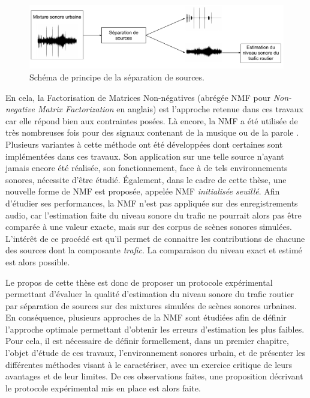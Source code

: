 \begin{figure}[h]
\centering
\includegraphics[width=\linewidth]{./figures/autres/schema_source_separation_FR.pdf}
\caption{Schéma de principe de la séparation de sources.}
\label{fig:separation_source_intro}
\end{figure}


En cela, la Factorisation de Matrices Non-négatives (abrégée NMF pour \textit{Non-negative Matrix Factorization} en anglais) \cite{lee_learning_1999} est l'approche retenue dans ces travaux car elle répond bien aux contraintes posées. Là encore, la NMF a été utilisée de très nombreuses fois pour des signaux contenant de la musique \cite{helen2005separation,fevotte_nonnegative_2009} ou de la parole \cite{wilson2008speech,schmidt2006single}. Plusieurs variantes à cette méthode ont été développées dont certaines sont implémentées dans ces travaux. Son application sur une telle source n'ayant jamais encore été réalisée, son fonctionnement, face à de tels environnements sonores,  nécessite d'être étudié. Également, dans le cadre de cette thèse, une nouvelle forme de NMF est proposée, appelée NMF \textit{initialisée seuillé}.
Afin d'étudier ses performances, la NMF n'est pas appliquée sur des enregistrements audio, car l'estimation faite du niveau sonore du trafic ne pourrait alors pas être comparée à une valeur exacte, mais sur des corpus de scènes sonores simulées. L'intérêt de ce procédé est qu'il permet de connaitre les contributions de chacune des sources dont la composante \textit{trafic}. La comparaison du niveau exact et estimé est alors possible.

Le propos de cette thèse est donc de proposer un protocole expérimental permettant d'évaluer la qualité d'estimation du niveau sonore du trafic routier par séparation de sources sur des mixtures simulées de scènes sonores urbaines. En conséquence, plusieurs approches de la NMF sont étudiées afin de définir l'approche optimale permettant d'obtenir les erreurs d'estimation les plus faibles.\\

Pour cela, il est nécessaire de définir formellement, dans un premier chapitre, l'objet d'étude de ces travaux, l'environnement sonores urbain, et de présenter les différentes méthodes visant à le caractériser, avec un exercice critique de leurs avantages et de leur limites. De ces observations faites, une proposition décrivant le protocole expérimental mis en place est alors faite.

